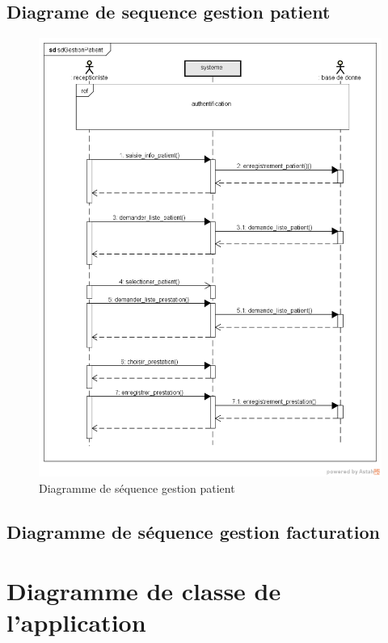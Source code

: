 	  \subsection{Diagrame de sequence gestion patient}
	  \begin{figure}[h]
	  \includegraphics[scale=0.9]{Chapitre2/images/sd_gererpatient}
\caption{Diagramme de  séquence gestion patient}
	  \end{figure}
	  
	  \newpage
	  
	  \subsection{Diagramme de séquence gestion facturation}
	  
	  \section{Diagramme de classe de l'application}
	  
